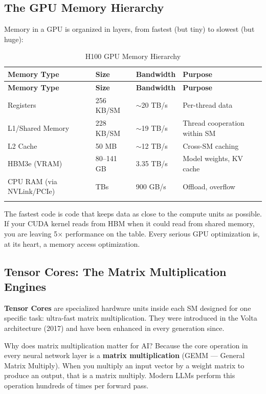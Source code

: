 \documentclass[11pt, twoside, openright]{book}
\newcommand{\tipbox}[2]{\begin{tcolorbox}[tipstyle, title={#1}]#2\end{tcolorbox}}
\newcommand{\keyterm}[1]{\textbf{\color{AccentOrange}#1}}
\begin{document}
\subsection{The GPU Memory Hierarchy}

Memory in a GPU is organized in layers, from fastest (but tiny) to slowest
(but huge):

\begin{longtable}{@{}p{3cm}p{2cm}p{2cm}p{5.5cm}@{}}
  \toprule
  \textbf{Memory Type} & \textbf{Size} & \textbf{Bandwidth} & \textbf{Purpose} \\
  \midrule
  \endfirsthead
  \toprule
  \textbf{Memory Type} & \textbf{Size} & \textbf{Bandwidth} & \textbf{Purpose} \\
  \midrule
  \endhead
  Registers & 256 KB/SM & $\sim$20 TB/s & Per-thread data \\
  L1/Shared Memory & 228 KB/SM & $\sim$19 TB/s & Thread cooperation within SM \\
  L2 Cache & 50 MB & $\sim$12 TB/s & Cross-SM caching \\
  HBM3e (VRAM)\index{HBM} & 80--141 GB & 3.35 TB/s & Model weights, KV cache \\
  CPU RAM (via NVLink/PCIe) & TBs & 900 GB/s & Offload, overflow \\
  \bottomrule
  \caption{H100 GPU Memory Hierarchy}
\end{longtable}

\tipbox{The Golden Rule of GPU Programming}{
The fastest code is code that keeps data as close to the compute units as possible.
If your CUDA kernel reads from HBM when it could read from shared memory, you are
leaving 5$\times$ performance on the table.  Every serious GPU optimization is,
at its heart, a memory access optimization.
}

\subsection{Tensor Cores: The Matrix Multiplication Engines}

\keyterm{Tensor Cores} are specialized hardware units inside
each SM designed for one specific task: ultra-fast matrix multiplication.  They
were introduced in the Volta architecture (2017) and have been enhanced in every
generation since.

Why does matrix multiplication matter for AI?  Because the core operation in every
neural network layer is a \textbf{matrix multiplication} (GEMM --- General Matrix
Multiply).  When you multiply an input vector by a weight matrix to produce an
output, that is a matrix multiply.  Modern LLMs perform this operation hundreds of
times per forward pass.
\end{document}
